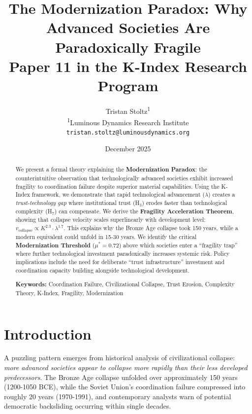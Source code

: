 \documentclass[11pt,a4paper]{article}
\title{\textbf{The Modernization Paradox: Why Advanced Societies Are Paradoxically Fragile} \\
\large Paper 11 in the K-Index Research Program}
\author{
Tristan Stoltz\textsuperscript{1} \\
\textsuperscript{1}Luminous Dynamics Research Institute \\
\texttt{tristan.stoltz@luminousdynamics.org}
}
\date{December 2025}
\begin{document}
\maketitle

\begin{abstract}
We present a formal theory explaining the \textbf{Modernization Paradox}: the counterintuitive observation that technologically advanced societies exhibit increased fragility to coordination failure despite superior material capabilities. Using the K-Index framework, we demonstrate that rapid technological advancement ($\lambda$) creates a \textit{trust-technology gap} where institutional trust (H$_3$) erodes faster than technological complexity (H$_7$) can compensate. We derive the \textbf{Fragility Acceleration Theorem}, showing that collapse velocity scales superlinearly with development level: $v_{\text{collapse}} \propto K^{2.3} \cdot \lambda^{1.7}$. This explains why the Bronze Age collapse took 150 years, while a modern equivalent could unfold in 15-30 years. We identify the critical \textbf{Modernization Threshold} ($\mu^* = 0.72$) above which societies enter a ``fragility trap'' where further technological investment paradoxically increases systemic risk. Policy implications include the need for deliberate ``trust infrastructure'' investment and coordination capacity building alongside technological development.

\vspace{0.5em}
\noindent\textbf{Keywords:} Coordination Failure, Civilizational Collapse, Trust Erosion, Complexity Theory, K-Index, Fragility, Modernization
\end{abstract}

\section{Introduction}

A puzzling pattern emerges from historical analysis of civilizational collapse: \textit{more advanced societies appear to collapse more rapidly than their less developed predecessors}. The Bronze Age collapse unfolded over approximately 150 years (1200-1050 BCE), while the Soviet Union's coordination failure compressed into roughly 20 years (1970-1991), and contemporary analysts warn of potential democratic backsliding occurring within single decades.
\end{document}
